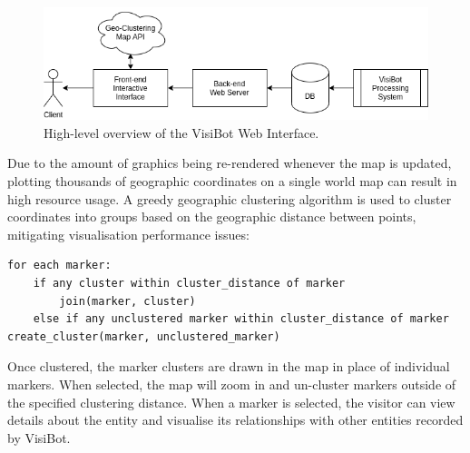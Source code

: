 \begin{figure}[!htb]
    \centering
    \includegraphics[width=0.7\linewidth]{flowcharts/design_overview_webapp.png}
    \caption{High-level overview of the VisiBot Web Interface.}
    \label{fig:webapp_design_overview} 
\end{figure}

Due to the amount of graphics being re-rendered whenever the map is updated, plotting thousands of geographic coordinates on a single world map can result in high resource usage. A greedy geographic clustering algorithm is used to cluster coordinates into groups based on the geographic distance between points, mitigating visualisation performance issues:

\begin{lstlisting}[caption={Pseudocode for Greedy clustering algorithm based on an example by \citet{MarkerClustering}}]
for each marker:
    if any cluster within cluster_distance of marker
        join(marker, cluster)
    else if any unclustered marker within cluster_distance of marker          create_cluster(marker, unclustered_marker)
\end{lstlisting}

Once clustered, the marker clusters are drawn in the map in place of individual markers. When selected, the map will zoom in and un-cluster markers outside of the specified clustering distance. When a marker is selected, the visitor can view details about the entity and visualise its relationships with other entities recorded by VisiBot.
